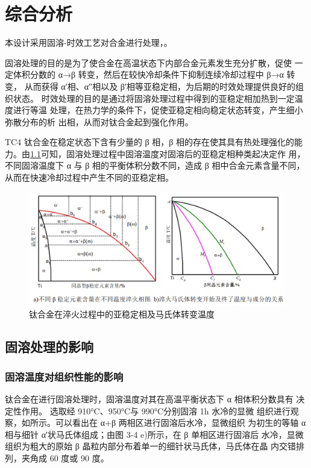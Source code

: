 \chapter{综合分析}


本设计采用固溶-时效工艺对合金进行处理，。

固溶处理的目的是为了使合金在高温状态下内部合金元素发生充分扩散，促使 一定体积分数的 α→β 转变，然后在较快冷却条件下抑制连续冷却过程中 β→α 转变， 从而获得 α′相、α′′相以及 β′相等亚稳定相，为后期的时效处理提供良好的组织状态。 时效处理的目的是通过将固溶处理过程中得到的亚稳定相加热到一定温度进行等温 处理，在热力学的条件下，促使亚稳定相向稳定状态转变，产生细小弥散分布的析 出相，从而对钛合金起到强化作用。

TC4 钛合金在稳定状态下含有少量的 β 相，β 相的存在使其具有热处理强化的能 力。由\ref{fig:tc4change}可知，固溶处理过程中固溶温度对固溶后的亚稳定相种类起决定作 用，不同固溶温度下 α 与 β 相的平衡体积分数不同，造成 β 相中合金元素含量不同， 从而在快速冷却过程中产生不同的亚稳定相。
\begin{figure}[h!]
	\centering
	\includegraphics[width=0.7\linewidth]{pic/tc4change}
	\caption{钛合金在淬火过程中的亚稳定相及马氏体转变温度}
	\label{fig:tc4change}
\end{figure}
\section{固溶处理的影响}
\subsection{固溶温度对组织性能的影响}
钛合金在进行固溶处理时，固溶温度对其在高温平衡状态下 α 相体积分数具有 决定性作用。
选取经 910°C、950°C与 990°C分别固溶 1h 水冷的显微 组织进行观察，如所示。可以看出在 α+β 两相区进行固溶后水冷，显微组织 为初生的等轴 α 相与细针 α′状马氏体组成；由图 3-4 e)所示，在 β 单相区进行固溶后 水冷，显微组织为粗大的原始 β 晶粒内部分布着单一的细针状马氏体，马氏体在晶 内交错排列，夹角成 60 度或 90 度。

